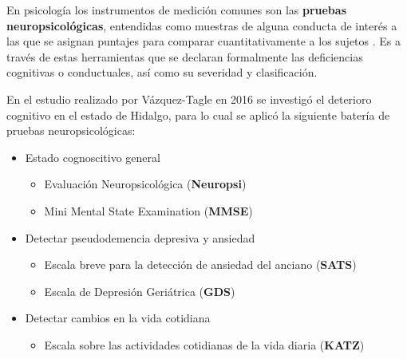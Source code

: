 En psicología los instrumentos de medición comunes son las \textbf{pruebas neuropsicológicas}, 
entendidas como muestras de alguna conducta de interés a las que se asignan puntajes para comparar 
cuantitativamente a los sujetos \cite{Ardila12}.
%
Es a través de estas herramientas que se declaran formalmente las deficiencias cognitivas o 
conductuales, así como su severidad y clasificación.


En el estudio realizado por Vázquez-Tagle en 2016 \cite{VazquezTagle16} se investigó el deterioro
cognitivo en el estado de Hidalgo, para lo cual se aplicó la siguiente batería de pruebas
neuropsicológicas:
\begin{itemize}
\item Estado cognoscitivo general
\begin{itemize}
\item {Evaluación Neuropsicológica (\textbf{Neuropsi})} \cite{Solis03}
\item {Mini Mental State Examination (\textbf{MMSE})} \cite{Velasco15}
\end{itemize}
\item Detectar pseudodemencia depresiva y ansiedad
\begin{itemize}
\item {Escala breve para la detección de ansiedad del anciano (\textbf{SATS})} \cite{Vargas11}
\item {Escala de Depresión Geriátrica (\textbf{GDS})} \cite{Yesavage82}
\end{itemize}
\item Detectar cambios en la vida cotidiana
\begin{itemize}
\item {Escala sobre las actividades cotidianas de la vida diaria (\textbf{KATZ})} \cite{Roumec14}
\end{itemize}
\end{itemize}



